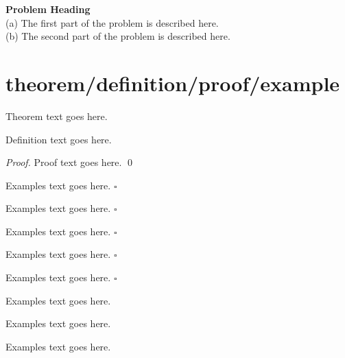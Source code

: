 \begin{prob}
	\label{prob2}
	\textbf{Problem Heading}\\
	(a) The first part of the problem is described here.\\
	(b) The second part of the problem is described here.
\end{prob}


\section{theorem/definition/proof/example}
\begin{theorem}
	Theorem text goes here.
\end{theorem}

%
\begin{definition}[DfName]
	Definition text goes here.
\end{definition}

\begin{proof}
	Proof text goes here.
	\qed
\end{proof}

\begin{example}
	Examples text goes here.  \hfill$\square$ 
\end{example}

\begin{corollary}
	Examples text goes here.  \hfill$\square$ 
\end{corollary}

\begin{lemma}
	Examples text goes here.  \hfill$\square$ 
\end{lemma}

\begin{remark}
	Examples text goes here.  \hfill$\square$ 
\end{remark}

\begin{proposition}
	Examples text goes here.  \hfill$\square$ 
\end{proposition}

\begin{note}
	Examples text goes here.
\end{note}

\begin{problem}
	Examples text goes here.
\end{problem}

\begin{question}
	Examples text goes here.
\end{question}

